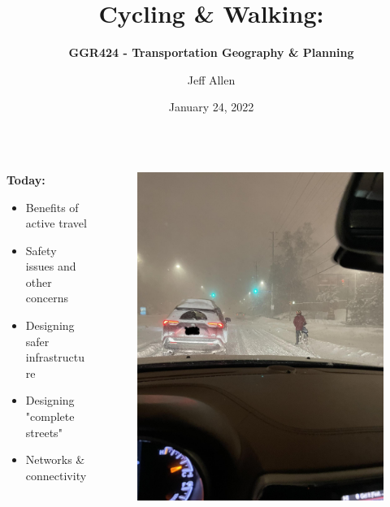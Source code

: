 \documentclass[aspectratio=169]{beamer}
\title{\textbf{Cycling \& Walking:}}
\subtitle{\textbf{GGR424 - Transportation Geography \& Planning}}
\author{Jeff Allen}
\institute{University of Toronto}
\date{January 24, 2022}
\begin{document}
	
\begin{frame}
	\titlepage	
\end{frame}




\begin{frame}
	\begin{columns}
		\begin{column}{0.5\textwidth}
			
			\textbf{Today:}
			\begin{itemize}
				\item Benefits of active travel
				
				\item Safety issues and other concerns
				
				\item Designing safer infrastructure
				
				\item Designing "complete streets"
				
				\item Networks \& connectivity
			\end{itemize}
			
		\end{column}
		
		\begin{column}{0.5\textwidth}
			\begin{figure}
				\centering
				\includegraphics[width=0.8\linewidth]{images/bike_winter.jpg}
			\end{figure}
			
		\end{column}
		
		
		
	\end{columns}
\end{frame}
\end{document}
